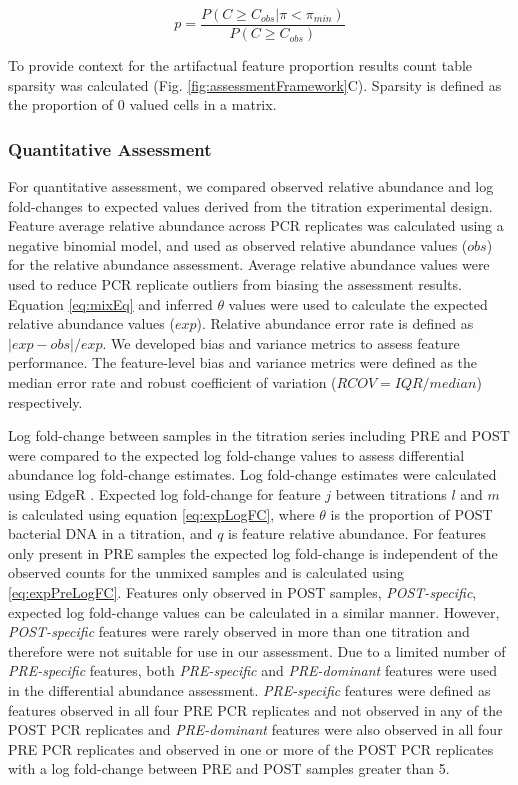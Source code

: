 \documentclass{bmcart}
\begin{document}
\begin{equation}
    p = \frac{P(C \geq C_{obs}| \pi < \pi_{min})}{P(C \geq C_{obs})}
  \label{eq:bht2}
\end{equation}

To provide context for the artifactual feature proportion results count table sparsity was calculated  (Fig. \ref{fig:assessmentFramework}C).
Sparsity is defined as the proportion of 0 valued cells in a matrix.

\subsubsection*{Quantitative Assessment}
For quantitative assessment, we compared observed relative abundance and
log fold-changes to expected values derived from the titration
experimental design.
Feature average relative abundance across PCR
replicates was calculated using a negative binomial model, and used as
observed relative abundance values (\(obs\)) for the relative abundance
assessment. Average relative abundance values were used to reduce PCR
replicate outliers from biasing the assessment results. Equation
\eqref{eq:mixEq} and inferred \(\theta\) values were used to calculate the
expected relative abundance values (\(exp\)). Relative abundance error
rate is defined as \(|exp - obs|/exp\).
We developed bias and variance metrics to assess feature performance.
The feature-level bias and variance metrics were defined as the median
error rate and robust coefficient of variation (\(RCOV=IQR/median\))
respectively.

Log fold-change between samples in the titration series including PRE
and POST were compared to the expected log fold-change values to assess
differential abundance log fold-change estimates. Log fold-change
estimates were calculated using EdgeR
\cite{Robinson2010, McCarthy2012}. Expected log fold-change for feature
\(j\) between titrations \(l\) and \(m\) is calculated using equation
\eqref{eq:expLogFC}, where \(\theta\) is the proportion of POST bacterial
DNA in a titration, and \(q\) is feature relative abundance. For
features only present in PRE samples the expected log fold-change is
independent of the observed counts for the unmixed samples and is
calculated using \eqref{eq:expPreLogFC}. Features only observed in POST
samples, \emph{POST-specific}, expected log fold-change values can be
calculated in a similar manner. However, \emph{POST-specific} features
were rarely observed in more than one titration and therefore were not
suitable for use in our assessment. Due to a limited number of
\emph{PRE-specific} features, both \emph{PRE-specific} and
\emph{PRE-dominant} features were used in the differential abundance
assessment. \emph{PRE-specific} features were defined as features
observed in all four PRE PCR replicates and not observed in any of the
POST PCR replicates and \emph{PRE-dominant} features were also observed
in all four PRE PCR replicates and observed in one or more of the POST
PCR replicates with a log fold-change between PRE and POST samples
greater than 5.
\end{document}
